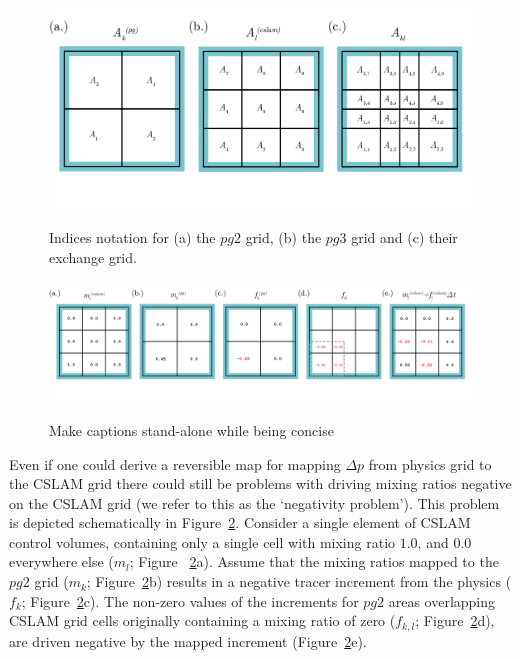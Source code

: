 \begin{figure}[t]
\begin{center}
\noindent\includegraphics[width=30pc,angle=0]{figs/area-schematic.png}\\
\end{center}
\caption{Indices notation for (a) the $pg2$ grid, (b) the $pg3$ grid and (c) their exchange grid.}
\label{fig:area-schematic}
\end{figure}

\begin{figure}[t]
\begin{center}
\noindent\includegraphics[width=30pc,angle=0]{figs/alg-schematic.png}\\
\end{center}
\caption{Make captions stand-alone while being concise}
\label{fig:alg-schematic}
\end{figure}

Even if one could derive a reversible map for mapping $\Delta p$ from physics grid to the CSLAM grid there could still be problems with driving mixing ratios negative on the CSLAM grid (we refer to this as the `negativity problem'). This problem is depicted schematically in Figure~\ref{fig:alg-schematic}. Consider a single element of CSLAM control volumes, containing only a single cell with mixing ratio $1.0$, and $0.0$ everywhere else ($m_l$; Figure ~\ref{fig:alg-schematic}a). Assume that the mixing ratios mapped to the $pg2$ grid ($m_k$; Figure~\ref{fig:alg-schematic}b) results in a negative tracer increment from the physics ($f_k$; Figure~\ref{fig:alg-schematic}c). The non-zero values of the increments for $pg2$ areas overlapping CSLAM grid cells originally containing a mixing ratio of zero ($f_{k,l}$; Figure~\ref{fig:alg-schematic}d), are driven negative by the mapped increment (Figure~\ref{fig:alg-schematic}e). 

